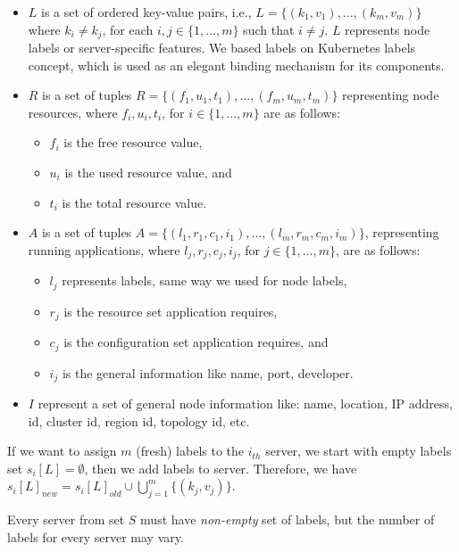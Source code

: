 \begin{itemize}
	\item $L$ is a set of ordered key-value pairs, i.e., $L = \{(k_1,v_1),\ldots ,(k_m,v_m)\}$ where $k_i \not= k_j$, for each $i,j\in \{1, \ldots , m\}$ such that $i\not= j$. $L$ represents node labels or server-specific features.  
	We based labels on Kubernetes  \cite{RossiCPN20} labels concept, which is used as an elegant binding mechanism for its components.
	\item $R$ is a set of tuples $R = \{(f_1,u_1,t_1),\ldots ,(f_m,u_m,t_m)\}$ representing node resources, where $f_i,u_i,t_i$, for $i\in\{1,\ldots,m\}$ are as follows:
		\begin{itemize}
			\item $f_i$ is the free resource value, 
			\item $u_i$ is the used resource value, and 
			\item $t_i$ is the total resource value. 
		\end{itemize}
	\item $A$ is a set of tuples $A = \{(l_1,r_1,c_1,i_1), \ldots ,(l_m,r_m,c_m,i_m)\}$, representing running applications, where $l_j,r_j,c_j,i_j$, for $j\in\{1,\ldots,m\}$, are as follows: 
		\begin{itemize}
			\item  $l_j$ represents labels, same way we used for node labels, 
			\item $r_j$ is the resource set application requires, 
			\item $c_j$ is the configuration set application requires, and 
			\item $i_j$ is the general information like name, port, developer. 
		\end{itemize}
	\item $I$ represent a set of general node information like: name, location, IP address, id, cluster id, region id, topology id, etc.
\end{itemize}

If we want to assign $m$ (fresh) labels to the $i_\mathit{th}$ server, 
we start with empty labels set $s_i[L]=\emptyset$, then we add labels to server. Therefore, we have $s_i[L]_\mathit{new} = s_i[L]_\mathit{old} \cup \bigcup%
_{j=1}^{m} \{(k_j,v_j)\}$.

\begin{definition}
Every server from set $S$ must have \emph{non-empty} set of labels, but the number of labels for every server may vary.
\end{definition}

